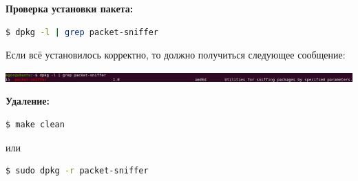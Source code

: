 \newpage

\textbf{Проверка установки пакета:}
\begin{lstlisting}[language=bash]
$ dpkg -l | grep packet-sniffer
\end{lstlisting}
\indent Если всё установилось корректно, то должно получиться следующее сообщение:
\vspace{-1cm}
\begin{center}
    \includegraphics[scale=0.32]{../assets/check.png}
\end{center}

\textbf{Удаление:}
\begin{lstlisting}[language=bash]
$ make clean
\end{lstlisting}
или
\begin{lstlisting}[language=bash]
$ sudo dpkg -r packet-sniffer
\end{lstlisting}
